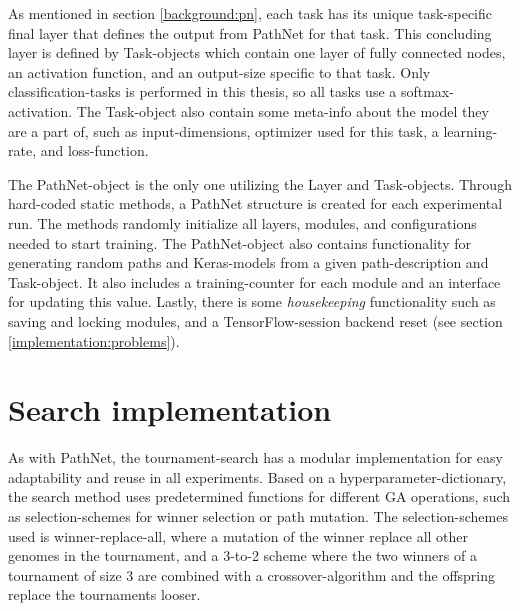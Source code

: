 As mentioned in section \ref{background:pn}, each task has its unique task-specific final layer that defines the output from PathNet for that task. This concluding layer is defined by Task-objects which contain one layer of fully connected nodes, an activation function, and an output-size specific to that task. Only classification-tasks is performed in this thesis, so all tasks use a softmax-activation. The Task-object also contain some meta-info about the model they are a part of, such as input-dimensions, optimizer used for this task, a learning-rate, and loss-function. 

The PathNet-object is the only one utilizing the Layer and Task-objects. Through hard-coded static methods, a PathNet structure is created for each experimental run. The methods randomly initialize all layers, modules, and configurations needed to start training. The PathNet-object also contains functionality for generating random paths and Keras-models from a given path-description and Task-object. It also includes a training-counter for each module and an interface for updating this value. Lastly, there is some \textit{housekeeping} functionality such as saving and locking modules, and a TensorFlow-session backend reset (see section \ref{implementation:problems}).

\section{Search implementation}
\label{implementation.search}
As with PathNet, the tournament-search has a modular implementation for easy adaptability and reuse in all experiments. Based on a hyperparameter-dictionary, the search method uses predetermined functions for different GA operations, such as selection-schemes for winner selection or path mutation. The selection-schemes used is winner-replace-all, where a mutation of the winner replace all other genomes in the tournament, and a 3-to-2 scheme where the two winners of a tournament of size 3 are combined with a crossover-algorithm and the offspring replace the tournaments looser.

